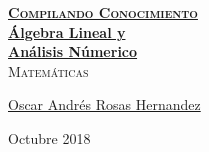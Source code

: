 \documentclass[12pt, fleqn]{report}                             %
\author{Oscar Andrés Rosas}                                     %
\theoremstyle{break}                                            %
\begin{document}
\begin{titlepage}
    
    \pagecolor{TitlePageColor}                                      %
    \color{white}                                                   %

    \vspace                                                         %
    \baselineskip                                                   %

    \makebox[0pt][l]{\rule{1.3\textwidth}{3pt}}                     %
    
    \href{https://compilandoconocimiento.com}                       %
    {\textbf{\textsc{\Huge Compilando Conocimiento}}}\\[2.7cm]      %

    \href{\ProjectNameLink}                                         %
    {\fontsize{45}{58}\selectfont \textbf{Álgebra Lineal y \\ Análisis Númerico}}\\[0.5cm] %
    \textcolor{ColorSubtext}{\textsc{\Huge Matemáticas}}            %
    
    \vfill                                                          %
    
    \href{\ProjectAuthorLink}                                       %
    {\LARGE \textsf{Oscar Andrés Rosas Hernandez}}                  %

    \vspace                                                         %
    \baselineskip                                                   %
    
    {\large \textsf{Octubre 2018}}                                  %
\end{titlepage}
\end{document}
